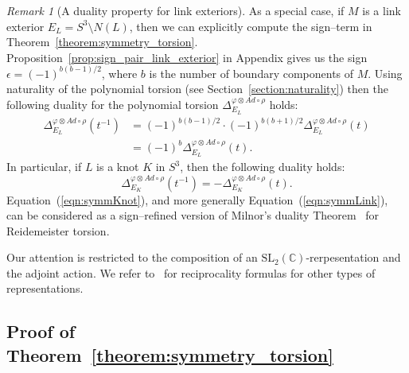 \documentclass[a4paper]{amsart}
\theoremstyle{plain}
\theoremstyle{definition}
\theoremstyle{remark}
\newtheorem{remark}{Remark}%
\newcommand{\CC}{{\mathbb C}}
\newcommand{\SL}{{\mathrm{SL}_2(\CC)}}
\newcommand{\PolyTors}[2]{\Delta_{#1}^{#2}}
\newcommand{\otAd}[2]{#1 \otimes Ad \circ #2}
\begin{document}
\begin{remark}[A duality property for link exteriors]
  As a special case, if $M$ is a link exterior $E_L =S^3 \setminus N(L)$,
  then we can explicitly compute the sign--term in
  Theorem~\ref{theorem:symmetry_torsion}. 
  Proposition~\ref{prop:sign_pair_link_exterior} in Appendix
  gives us the sign $\epsilon = (-1)^{b(b-1)/2}$, where $b$ is the number of boundary components of $M$. Using naturality of
  the polynomial torsion (see Section~\ref{section:naturality}) then the
  following duality for the polynomial torsion
  $\PolyTors{E_L}{\otAd{\varphi}{\rho}}$ holds:
  \begin{align}
    \PolyTors{E_L}{\otAd{\varphi}{\rho}}(t^{-1}) 
      &=(-1)^{b(b-1)/2} \cdot (-1)^{b(b+1)/2} \PolyTors{E_L}{\otAd{\varphi}{\rho}}(t) \nonumber\\
      &=(-1)^b \PolyTors{E_L}{\otAd{\varphi}{\rho}}(t) \label{eqn:symmLink}.
  \end{align}
  In particular, if $L$ is a knot $K$ in $S^3$, then the
  following duality holds:
  \begin{equation}\label{eqn:symmKnot}
    \PolyTors{E_K}{\otAd{\varphi}{\rho}}(t^{-1}) =  
     - \PolyTors{E_K}{\otAd{\varphi}{\rho}}(t).
  \end{equation}
  Equation~(\ref{eqn:symmKnot}), and more generally
  Equation~(\ref{eqn:symmLink}), can be considered as a sign--refined
  version of Milnor's duality Theorem~\cite{Milnor:1962} for
  Reidemeister torsion.
\end{remark}

Our attention is restricted to the composition of an
$\SL$-rerpesentation and the adjoint action.  We refer
to~\cite{FriedlKim:06, FriedlVidussi:survey,
  HSW:09} for reciprocality formulas for other types
of representations.


\subsection{Proof of Theorem~\ref{theorem:symmetry_torsion}}
\end{document}
